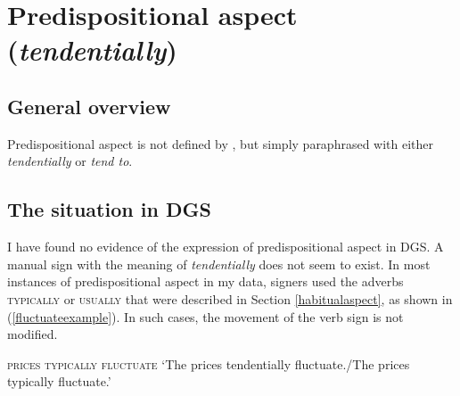 %
%


\section{Predispositional aspect (\textit{tendentially})}
\subsection{General overview}
Predispositional aspect is not defined by \citet{cinque1999adverbs, cinque2006restructuring}, but simply paraphrased with either \textit{tendentially} or \textit{tend to}. 

\subsection{The situation in DGS}
I have found no evidence of the expression of predispositional aspect in DGS. A manual sign with the meaning of \textit{tendentially} does not seem to exist. In most instances of predispositional aspect in my data, signers used the adverbs \textsc{typically} or \textsc{usually} that were described in Section \ref{habitualaspect}, as shown in (\ref{fluctuateexample}). In such cases, the movement of the verb sign is not modified. 

\begin{exe}
\ex \textsc{prices typically fluctuate}
\glt `The prices tendentially fluctuate./The prices typically fluctuate.' \label{fluctuateexample}
\end{exe}

